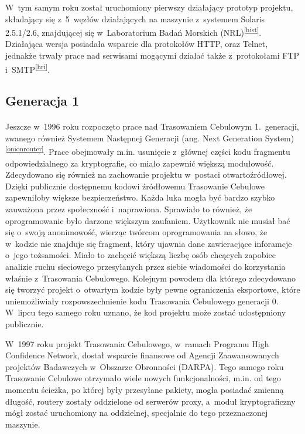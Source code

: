 W~tym samym roku został uruchomiony pierwszy działający prototyp projektu, składający się z~5~węzłów działających na maszynie z~systemem Solaris 2.5.1/2.6, znajdującej się w~Laboratorium Badań Morskich (NRL)\textsuperscript{\ref{hist}}. Działająca wersja posiadała wsparcie dla protokołów HTTP, oraz Telnet, jednakże trwały prace nad serwisami mogącymi działać także z~protokołami FTP i~SMTP\textsuperscript{\ref{hri}}.

\subsection{Generacja 1}\paragraph{}
Jeszcze w~1996 roku rozpoczęto prace nad Trasowaniem Cebulowym 1.~generacji, zwanego również Systemem Następnej Generacji (ang. Next Generation System)\textsuperscript{\ref{onionrouter}}. Prace obejmowały m.in. usunięcie z~głównej części kodu fragmentu odpowiedzialnego za kryptografie, co miało zapewnić większą modułowość. Zdecydowano się również na zachowanie projektu w~postaci otwartoźródłowej. Dzięki publicznie dostępnemu kodowi źródłowemu Trasowanie Cebulowe zapewniłoby większe bezpieczeństwo. Każda luka mogła być bardzo szybko zauważona przez społeczność i~naprawiona. Sprawiało to również, że oprogramowanie było darzone większym zaufaniem. Użytkownik nie musiał bać się o~swoją anonimowość, wierząc twórcom oprogramowania na słowo, że w~kodzie nie znajduje się fragment, który ujawnia dane zawieracjące inforamcje o~jego tożsamości. Miało to zachęcić większą liczbę osób chcących zapobiec analizie ruchu sieciowego przesyłanych przez siebie wiadomości do korzystania właśnie z~Trasowania Cebulowego. Kolejnym powodem dla którego zdecydowano się tworzyć projekt o~otwartym kodzie były pewne ograniczenia eksportowe, które uniemożliwiały rozpowszechnienie kodu Trasowania Cebulowego generacji 0. W~lipcu tego samego roku uznano, że kod projektu może zostać udostępniony publicznie.

W~1997 roku projekt Trasowania Cebulowego,  w~ramach Programu High Confidence Network, dostał wsparcie finansowe od Agencji Zaawansowanych projektów Badawczych w~Obszarze Obronności (DARPA). Tego samego roku Trasowanie Cebulowe otrzymało wiele nowych funkcjonalności, m.in. od tego momentu ścieżka, po której były przesyłane pakiety, mogła posiadać zmienną długość, routery zostały oddzielone od serwerów proxy, a~moduł kryptograficzny mógł zostać uruchomiony na oddzielnej, specjalnie do tego przeznaczonej maszynie. 

